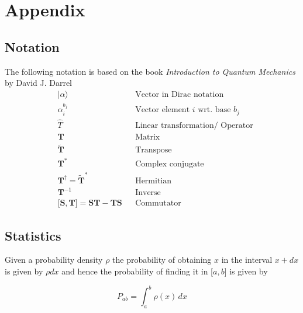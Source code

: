 \section{Appendix}
\subsection{Notation}
The following notation is based on the book \textit{Introduction to Quantum Mechanics} by David J. Darrel
\begin{align*}
     & \lvert \alpha \rangle                                             &  & \text{Vector in Dirac notation}           \\
     & \alpha_i^{b_j}                                                    &  & \text{Vector element $i$ wrt.\ base } b_j \\
     & \widehat{T}                                                       &  & \text{Linear transformation/ Operator}    \\
     & \mathbf{T}                                                        &  & \text{Matrix}                             \\
     & \widetilde{\mathbf{T}}                                            &  & \text{Transpose}                          \\
     & \mathbf{T}^*                                                      &  & \text{Complex conjugate}                  \\
     & \mathbf{T}^\dagger = {\widetilde{\mathbf{T}}}^*                   &  & \text{Hermitian}                          \\
     & \mathbf{T}^{-1}                                                   &  & \text{Inverse}                            \\
     & \lbrack \mathbf{S},\mathbf{T} \rbrack = \mathbf{ST} - \mathbf{TS} &  & \text{Commutator}
\end{align*}

\subsection{Statistics}
Given a probability density $\rho$ the probability of obtaining $x$ in the interval $x+dx$ is given by $\rho dx$ and hence the probability of finding it in [$a,b$] is given by

\begin{equation*}
    P_{ab}=\int_{a}^{b} \rho(x)\, dx
\end{equation*}

